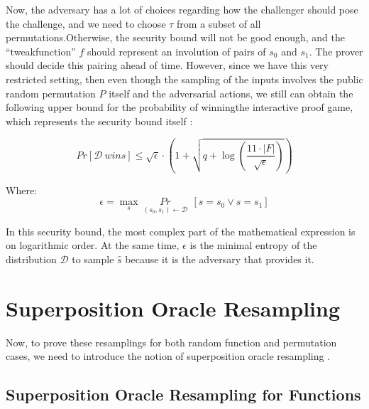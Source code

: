 \documentclass[12pt]{article}
\begin{document}
    
    \noindent Now, the adversary has a lot of choices regarding how the challenger should pose the challenge, and we need to choose $\tau$ from a subset of all permutations.\break Otherwise, the security bound will not be good enough, and the ``tweak\break function'' $f$ should represent an involution of pairs of ${s}_{0}$ and ${s}_{1}$. The prover should decide this pairing ahead of time. However, since we have this very restricted setting, then even though the sampling of the inputs involves the public random permutation $P$ itself and the adversarial actions, we still can obtain the following upper bound for the probability of winning\break the interactive proof game, which represents the security bound itself \cite{alagic-et-al:post-quantum-security-tweakable-even-mansour-applications:2022:03-2024}:

    $$ Pr[\mathcal{D}\ wins] \leq \sqrt{\epsilon} \cdot \left( 1 + \sqrt{q + \log\left( \frac{11 \cdot |F|}{\sqrt{\epsilon}} \right)} \right) $$

    \vspace{2ex}

    \centering
    \noindent Where:
    $$ \epsilon = \max_{s}\ \underset{({s}_{0}, {s}_{1}) \leftarrow \mathcal{D}}{Pr}\ \ [s = {s}_{0} \vee s = {s}_{1}] $$

    \justifying
    \noindent In this security bound, the most complex part of the mathematical expression is on logarithmic order. At the same time, $\epsilon$ is the minimal entropy of the distribution $\mathcal{D}$ to sample $\hat{s}$ because it is the adversary that provides it.

    \section{Superposition Oracle Resampling}
    \label{sec:superposition-oracle-resampling}

    Now, to prove these resamplings for both random function and permutation cases, we need to introduce the notion of superposition oracle resampling \cite{zhandry:how-record-quantum-queries-applications-quantum-indifferentiability:2018:03-2024}.
    
    \subsection{Superposition Oracle Resampling for Functions}
    \label{subsec:superposition-oracle-resampling-functions}
\end{document}
